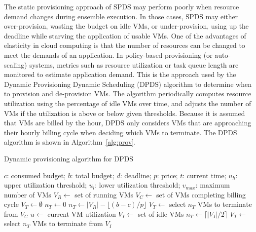 \documentclass[conference]{IEEEtran}
\begin{document}
The static provisioning approach of SPDS may perform poorly when resource demand changes during ensemble execution. In those cases, SPDS may either over-provision, wasting the budget on idle VMs, or under-provision, using up the deadline while starving the application of usable VMs. One of the advantages of elasticity in cloud computing is that the number of resources can be changed to meet the demands of an application. In policy-based provisioning (or auto-scaling) systems, metrics such as resource utilization or task queue length are monitored to estimate application demand. This is the approach used by the Dynamic Provisioning Dynamic Scheduling (DPDS) algorithm to determine when to provision and de-provision VMs. The algorithm periodically computes resource utilization using the percentage of idle VMs over time, and adjusts the number of VMs if the utilization is above or below given thresholds. Because it is assumed that VMs are billed by the hour, DPDS only considers VMs that are approaching their hourly billing cycle when deciding which VMs to terminate. The DPDS algorithm is shown in Algorithm~\ref{alg:prov}.

\begin{algorithm}[tb]
\caption{Dynamic provisioning algorithm for DPDS}
\label{alg:prov}
\begin{algorithmic}[1]
\Require $c$: consumed budget; $b$: total budget; $d$: deadline; $p$: price;
$t$: current time; $u_h$: upper utilization threshold; $u_l$: lower utilization
threshold; $v_{max}$: maximum number of VMs
  \State $V_R\gets$ set of running VMs
    \State $V_C\gets$ set of VMs completing billing cycle
    \State $V_T\gets \emptyset$ 
    \State $n_T\gets 0$ 
      \State $n_T\gets |V_R| - \lfloor(b-c)/p\rfloor$
      \State $V_T\gets$ select $n_T$ VMs to terminate from $V_C$
      \State {} \label{l:terminate1}
    \Else 
    \State $u\gets$ current VM utilization
        \State {}
        \State $V_I\gets$ set of idle VMs
        \State $n_T\gets \lceil|V_I|/2\rceil$ \label{l:nT2}
      \State $V_T\gets$ select $n_T$ VMs to terminate from $V_I$
        \State {} \label{l:terminate2}
      \EndIf 
    \EndIf
\EndProcedure
\end{algorithmic} 
\end{algorithm}
\end{document}
